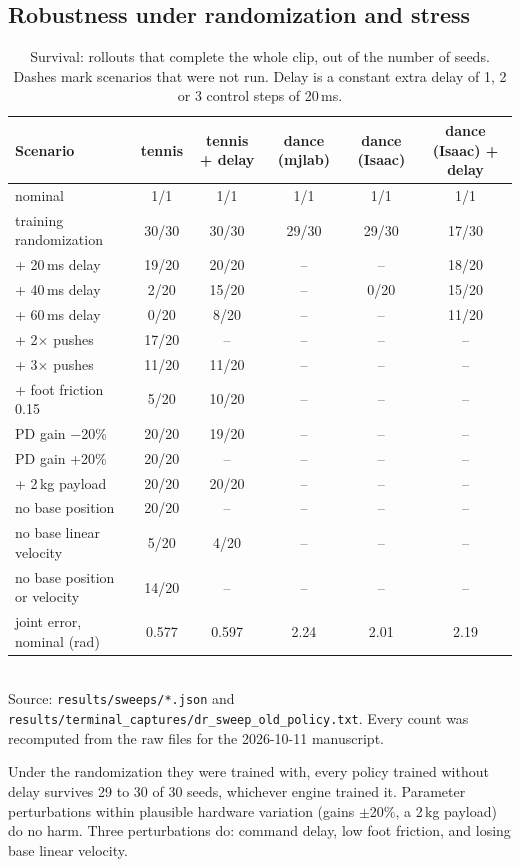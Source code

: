 \documentclass[11pt]{article}
\newcommand{\code}[1]{\texttt{#1}}
\begin{document}
\subsection{Robustness under randomization and stress}
\begin{table}[!htbp]
\centering\small
\caption{Survival: rollouts that complete the whole clip, out of the number of seeds. Dashes mark scenarios that were not run. Delay is a constant extra delay of 1, 2 or 3 control steps of 20\,ms.}
\label{tab:survival}
\begin{tabularx}{\linewidth}{@{}Xccccc@{}}
\toprule
Scenario & tennis & tennis + delay & dance (mjlab) & dance (Isaac) & dance (Isaac) + delay\\
\midrule
nominal & 1/1 & 1/1 & 1/1 & 1/1 & 1/1\\
training randomization & 30/30 & 30/30 & 29/30 & 29/30 & 17/30\\
+ 20\,ms delay & 19/20 & 20/20 & -- & -- & 18/20\\
+ 40\,ms delay & 2/20 & 15/20 & -- & 0/20 & 15/20\\
+ 60\,ms delay & 0/20 & 8/20 & -- & -- & 11/20\\
+ 2$\times$ pushes & 17/20 & -- & -- & -- & --\\
+ 3$\times$ pushes & 11/20 & 11/20 & -- & -- & --\\
+ foot friction 0.15 & 5/20 & 10/20 & -- & -- & --\\
PD gain $-$20\% & 20/20 & 19/20 & -- & -- & --\\
PD gain +20\% & 20/20 & -- & -- & -- & --\\
+ 2\,kg payload & 20/20 & 20/20 & -- & -- & --\\
no base position & 20/20 & -- & -- & -- & --\\
no base linear velocity & 5/20 & 4/20 & -- & -- & --\\
no base position or velocity & 14/20 & -- & -- & -- & --\\
joint error, nominal (rad) & 0.577 & 0.597 & 2.24 & 2.01 & 2.19\\
\bottomrule
\end{tabularx}
\\[0.3em]{\footnotesize Source: \code{results/sweeps/*.json} and \code{results/terminal\_captures/dr\_sweep\_old\_policy.txt}. Every count was recomputed from the raw files for the 2026-10-11 manuscript.}
\end{table}

Under the randomization they were trained with, every policy trained without delay survives 29 to 30 of 30 seeds, whichever engine trained it. Parameter perturbations within plausible hardware variation (gains $\pm$20\%, a 2\,kg payload) do no harm. Three perturbations do: command delay, low foot friction, and losing base linear velocity.
\end{document}
